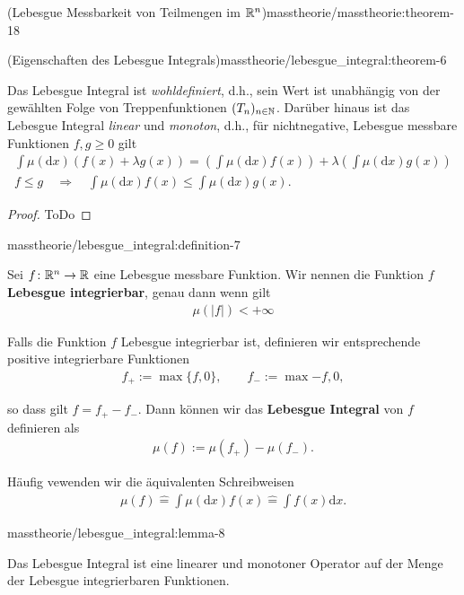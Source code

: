 \begin{theorem}{(Lebesgue Messbarkeit von Teilmengen im \protect\(\mathbb{R}^n\protect\))}{masstheorie/masstheorie:theorem-18}
\begin{theorem}{(Eigenschaften des Lebesgue Integrals)}{masstheorie/lebesgue_integral:theorem-6}
\par
Das Lebesgue Integral ist \emph{wohldefiniert}, d.h., sein Wert ist unabhängig von der gewählten Folge von Treppenfunktionen \((T_n)_{n\in\mathbb{N}}\).
Darüber hinaus ist das Lebesgue Integral \emph{linear} und \emph{monoton}, d.h., für nichtnegative, Lebesgue messbare Funktionen \(f,g \geq 0\) gilt
\begin{align*}
\int \mu(\mathrm{d}x)(f(x) + \lambda g(x)) = \left( \int \mu(\mathrm{d}x) f(x) \right) + \lambda \left( \int \mu(\mathrm{d}x) g(x) \right)\\
f \leq g \quad \Rightarrow \quad \int \mu(\mathrm{d}x) f(x) \leq \int \mu(\mathrm{d}x) g(x).
\end{align*}\end{theorem}

\begin{proof}
 ToDo
\end{proof}
\begin{definition}{}{masstheorie/lebesgue_integral:definition-7}



\par
Sei \(f \colon \mathbb{R}^n \rightarrow \mathbb{R}\) eine Lebesgue messbare Funktion.
Wir nennen die Funktion \(f\) \textbf{Lebesgue integrierbar}, genau dann wenn gilt
\begin{align*}
\mu(|f|) < +\infty
\end{align*}
\par
Falls die Funktion \(f\) Lebesgue integrierbar ist, definieren wir entsprechende positive integrierbare Funktionen
\begin{align*}
f_+ := \max \lbrace f, 0 \rbrace, \qquad f_- := \max{-f, 0},
\end{align*}
\par
so dass gilt \(f = f_+ - f_-\).
Dann können wir das \textbf{Lebesgue Integral} von \(f\) definieren als
\begin{align*}
\mu(f) := \mu(f_+) - \mu(f_-).
\end{align*}
\par
Häufig vewenden wir die äquivalenten Schreibweisen
\begin{align*}
\mu(f) \hat{=} \int \mu(\mathrm{d}x) f(x) \hat{=} \int f(x) \mathrm{d}x.
\end{align*}\end{definition}
\begin{lemma}{}{masstheorie/lebesgue_integral:lemma-8}



\par
Das Lebesgue Integral ist eine linearer und monotoner Operator auf der Menge der Lebesgue integrierbaren Funktionen.
\end{lemma}


\end{theorem}
